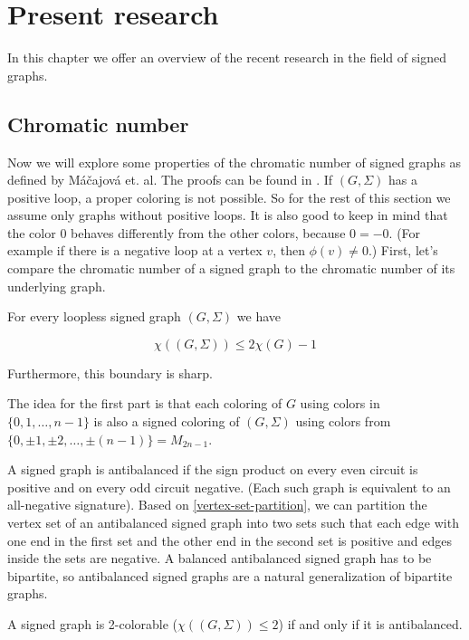 \chapter{Present research}\label{present-research}

In this chapter we offer an overview of the recent research in the field of signed graphs. 

\section{Chromatic number}

Now we will explore some properties of the chromatic number of signed graphs as defined by Máčajová et. al. The proofs can be found in \cite{chromatic-number}.
If $(G, \Sigma)$ has a positive loop, a proper coloring is not possible. So for the rest of this section we assume
only graphs without positive loops. It is also good to keep in mind that the color $0$ behaves differently from the other colors, because $0 = -0$. 
(For example if there is a negative loop at a vertex $v$, then $\phi (v) \neq 0$.)
First, let's compare the chromatic number of a signed graph to the chromatic number of its underlying graph.

\begin{theorem}[Máčajová et. al.]
    For every loopless signed graph $(G, \Sigma)$ we have

    $$\chi ((G, \Sigma)) \leq 2 \chi (G) - 1$$

    Furthermore, this boundary is sharp.
\end{theorem}

The idea for the first part is that each coloring of $G$ using colors in $\{0, 1, \dots, n-1\}$
is also a signed coloring of $(G, \Sigma)$ using colors from $\{0, \pm 1, \pm 2, \dots, \pm (n-1)\} = M_{2n-1}$.

A signed graph is antibalanced if the sign product on every even circuit is positive and on every odd circuit negative.
(Each such graph is equivalent to an all-negative signature). Based on \cref{vertex-set-partition}, we can partition the 
vertex set of an antibalanced signed graph into two sets such that each edge with one end in the first set and the other end in the second set is positive and edges inside the sets are negative.
A balanced antibalanced signed graph has to be bipartite, so antibalanced signed graphs are a natural generalization of bipartite graphs.

\begin{proposition}[Máčajová et. al.]
    A signed graph is 2-colorable ($\chi ((G, \Sigma)) \leq 2$) if and only if it is antibalanced.
\end{proposition}

